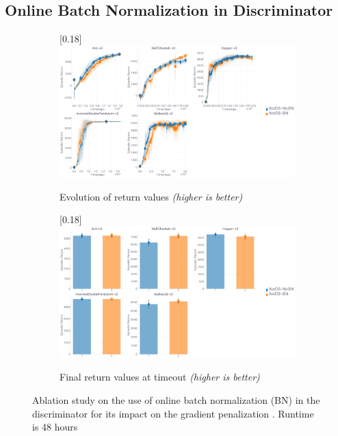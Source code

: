 \subsection{Online Batch Normalization in Discriminator}
\label{ablationbn}

\begin{figure}[H]
  \center
  \begin{subfigure}[t]{0.99\textwidth}
    \center\scalebox{0.18}[0.18]{\includegraphics{Plots/fig15_bs_ablation_5envs/plots_eval_env_ret_plot.pdf}}
    \caption{Evolution of return values \textit{(higher is better)}}
  \end{subfigure}
  \begin{subfigure}[t]{0.99\textwidth}
    \center\scalebox{0.18}[0.18]{\includegraphics{Plots/fig15_bs_ablation_5envs/plots_eval_env_ret_barplot.pdf}}
    \caption{Final return values at timeout \textit{(higher is better)}}
  \end{subfigure}
  \caption{
  Ablation study on the use of online batch normalization (BN) in the
  discriminator for its impact on the gradient penalization \cite{Gulrajani2017-mr}.
  Runtime is 48 hours}
\end{figure}

